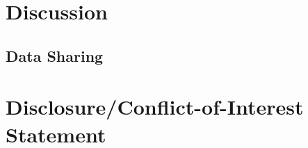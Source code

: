 \documentclass{frontiersSCNS}
\begin{document}
\section{Discussion}

\subsection{Data Sharing}


\section*{Disclosure/Conflict-of-Interest Statement}

\end{document}
